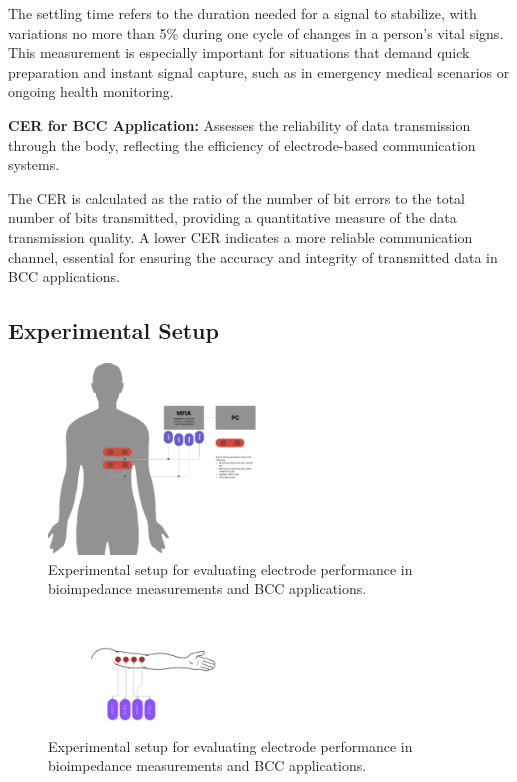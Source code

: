 \documentclass[conference]{IEEEtran}
\begin{document}
    The settling time refers to the duration needed for a signal to stabilize, with variations no more than 5\% during one cycle of changes in a person's vital signs. This measurement is especially important for situations that demand quick preparation and instant signal capture, such as in emergency medical scenarios or ongoing health monitoring.
    
\textbf{\gls{CER}  for \gls{BCC} Application:} Assesses the reliability of data transmission through the body, reflecting the efficiency of electrode-based communication systems.
    
    The \gls{CER} is calculated as the ratio of the number of bit errors to the total number of bits transmitted, providing a quantitative measure of the data transmission quality. A lower \gls{CER} indicates a more reliable communication channel, essential for ensuring the accuracy and integrity of transmitted data in \gls{BCC} applications.
    


\subsection{Experimental Setup}
\begin{figure}[!ht]
    \centering
    \includegraphics[width=0.5\textwidth]{figures/experimentSetup.png}
    \caption{Experimental setup for evaluating electrode performance in bioimpedance measurements and \gls{BCC} applications.}
    \label{fig:experimental_setup}
\end{figure}

\begin{figure}
    \centering
    \includegraphics[width=0.5\textwidth]{figures/experimentSetup_upper_arm.jpeg}
    \caption{Experimental setup for evaluating electrode performance in bioimpedance measurements and \gls{BCC} applications.}
    \label{fig:experimental_setup_upper_arm}
\end{figure}
\end{document}
